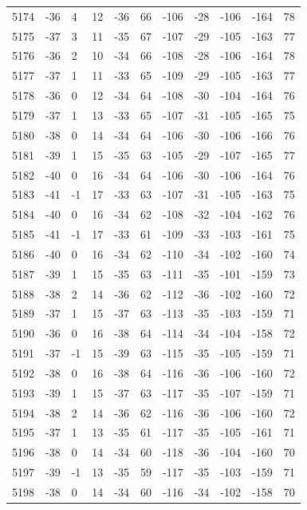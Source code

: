 \begin{table}[H]
\begin{tabular}{lllllllllll}
5174 & -36 & 4 & 12 & -36 & 66 & -106 & -28 & -106 & -164 & 78 \\
5175 & -37 & 3 & 11 & -35 & 67 & -107 & -29 & -105 & -163 & 77 \\
5176 & -36 & 2 & 10 & -34 & 66 & -108 & -28 & -106 & -164 & 78 \\
5177 & -37 & 1 & 11 & -33 & 65 & -109 & -29 & -105 & -163 & 77 \\
5178 & -36 & 0 & 12 & -34 & 64 & -108 & -30 & -104 & -164 & 76 \\
5179 & -37 & 1 & 13 & -33 & 65 & -107 & -31 & -105 & -165 & 75 \\
5180 & -38 & 0 & 14 & -34 & 64 & -106 & -30 & -106 & -166 & 76 \\
5181 & -39 & 1 & 15 & -35 & 63 & -105 & -29 & -107 & -165 & 77 \\
5182 & -40 & 0 & 16 & -34 & 64 & -106 & -30 & -106 & -164 & 76 \\
5183 & -41 & -1 & 17 & -33 & 63 & -107 & -31 & -105 & -163 & 75 \\
5184 & -40 & 0 & 16 & -34 & 62 & -108 & -32 & -104 & -162 & 76 \\
5185 & -41 & -1 & 17 & -33 & 61 & -109 & -33 & -103 & -161 & 75 \\
5186 & -40 & 0 & 16 & -34 & 62 & -110 & -34 & -102 & -160 & 74 \\
5187 & -39 & 1 & 15 & -35 & 63 & -111 & -35 & -101 & -159 & 73 \\
5188 & -38 & 2 & 14 & -36 & 62 & -112 & -36 & -102 & -160 & 72 \\
5189 & -37 & 1 & 15 & -37 & 63 & -113 & -35 & -103 & -159 & 71 \\
5190 & -36 & 0 & 16 & -38 & 64 & -114 & -34 & -104 & -158 & 72 \\
5191 & -37 & -1 & 15 & -39 & 63 & -115 & -35 & -105 & -159 & 71 \\
5192 & -38 & 0 & 16 & -38 & 64 & -116 & -36 & -106 & -160 & 72 \\
5193 & -39 & 1 & 15 & -37 & 63 & -117 & -35 & -107 & -159 & 71 \\
5194 & -38 & 2 & 14 & -36 & 62 & -116 & -36 & -106 & -160 & 72 \\
5195 & -37 & 1 & 13 & -35 & 61 & -117 & -35 & -105 & -161 & 71 \\
5196 & -38 & 0 & 14 & -34 & 60 & -118 & -36 & -104 & -160 & 70 \\
5197 & -39 & -1 & 13 & -35 & 59 & -117 & -35 & -103 & -159 & 71 \\
5198 & -38 & 0 & 14 & -34 & 60 & -116 & -34 & -102 & -158 & 70 \\

\end{tabular}
\end{table}
